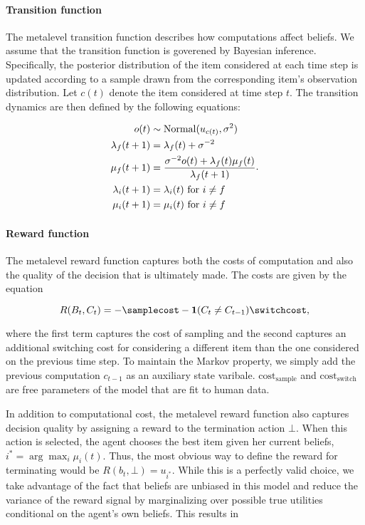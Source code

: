 \documentclass[12pt,a4paperpaper,]{article}
\begin{document}
\paragraph{Transition function}
The metalevel transition function describes how computations affect beliefs. We assume that the transition function is goverened by Bayesian inference. Specifically, the posterior distribution of the item considered at each time step is updated according to a sample drawn from the corresponding item's observation distribution. Let $c(t)$ denote the item considered at time step $t$. The transition dynamics are then defined by the following equations:

\begin{equation}
\begin{aligned}
  o(t) &\sim \mathrm{Normal}(u_{c(t)}, \sigma^2) \\
  \lambda_f(t+1) &= \lambda_f(t) + \sigma^{-2}  \\
  \mu_f(t+1) &= \frac{\sigma^{-2} o(t) + \lambda_f(t) \mu_f(t)}{\lambda_f(t+1)}  \\
  \lambda_i(t+1) &= \lambda_i(t) \text{ for } i \neq f  \\
  \mu_i(t+1) &= \mu_i(t) \text{ for } i \neq f  \\
\end{aligned}
.
\end{equation}

\paragraph{Reward function}
The metalevel reward function captures both the costs of computation and also the quality of the decision that is ultimately made. The costs are given by the equation

\begin{equation}
R(B_t, C_t) = -\samplecost - \mathbf{1}(C_t \neq C_{t-1}) \switchcost
,
\end{equation}

where the first term captures the cost of sampling and the second captures an additional switching cost for considering a different item than the one considered on the previous time step. To maintain the Markov property, we simply add the previous computation $c_{t-1}$ as an auxiliary state varibale. ${\text{cost}_\text{sample}}$ and ${\text{cost}_\text{switch}}$ are free parameters of the model that are fit to human data.

In addition to computational cost, the metalevel reward function also captures decision quality by assigning a reward to the termination action $\bot$. When this action is selected, the agent chooses the best item given her current beliefs, $i^* = \arg\max_i \mu_i(t)$. Thus, the most obvious way to define the reward for terminating would be $R(b_t, \bot) = u_{i^*}$. While this is a perfectly valid choice, we take advantage of the fact that beliefs are unbiased in this model and reduce the variance of the reward signal by marginalizing over possible true utilities conditional on the agent's own beliefs. This results in
\end{document}
